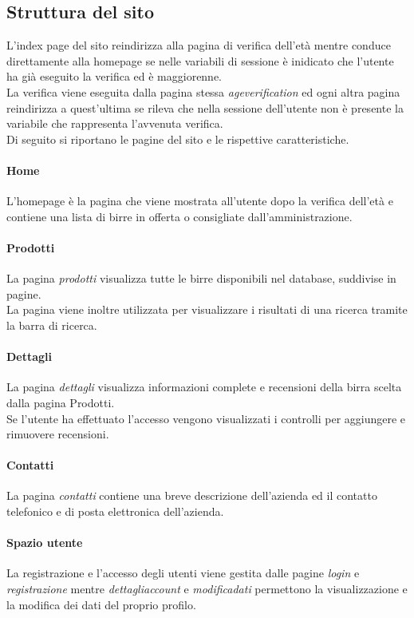 \subsection{Struttura del sito}
L'index page del sito reindirizza alla pagina di verifica dell'età mentre conduce direttamente alla homepage se nelle variabili di sessione è inidicato che l'utente ha già eseguito la verifica ed è maggiorenne.\\
La verifica viene eseguita dalla pagina stessa \textit{ageverification} ed ogni altra pagina reindirizza a quest'ultima se rileva che nella sessione dell'utente non è presente la variabile che rappresenta l'avvenuta verifica.\\
Di seguito si riportano le pagine del sito e le rispettive caratteristiche.

\paragraph{Home}
L'homepage è la pagina che viene mostrata all'utente dopo la verifica dell'età e contiene una lista di birre in offerta o consigliate dall'amministrazione.

\paragraph{Prodotti}
La pagina \textit{prodotti} visualizza tutte le birre disponibili nel database, suddivise in pagine.\\
La pagina viene inoltre utilizzata per visualizzare i risultati di una ricerca tramite la barra di ricerca.

\paragraph{Dettagli}
La pagina \textit{dettagli} visualizza informazioni complete e recensioni della birra scelta dalla pagina Prodotti.\\
Se l'utente ha effettuato l'accesso vengono visualizzati i controlli per aggiungere e rimuovere recensioni.

\paragraph{Contatti}
La pagina \textit{contatti} contiene una breve descrizione dell'azienda ed il contatto telefonico e di posta elettronica dell'azienda.

\paragraph{Spazio utente}
La registrazione e l'accesso degli utenti viene gestita dalle pagine \textit{login} e \textit{registrazione} mentre \textit{dettagliaccount} e \textit{modificadati} permettono la visualizzazione e la modifica dei dati del proprio profilo.

